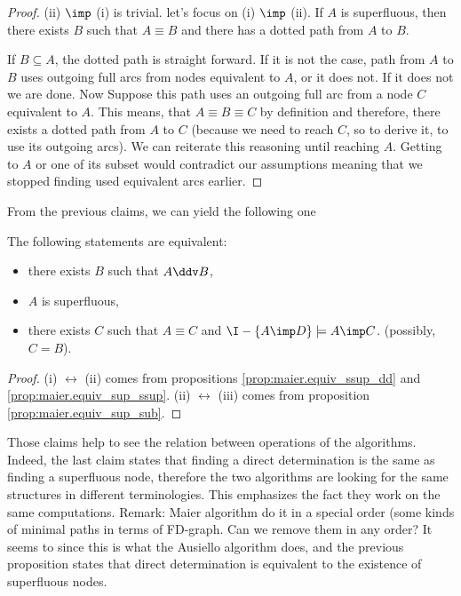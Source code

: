 \begin{proof} (ii) $\imp$ (i) is trivial. let's focus on (i) $\imp$ (ii). If 
	$A$ is superfluous, then there exists $B$ such that $A \equiv B$ and there 
	has a dotted path from $A$ to $B$.
	
	\vspace{1.2em}
	
	If $B \subseteq A$, the dotted path is straight forward. If it is not the 
	case, path from $A$ to $B$ uses outgoing full arcs from nodes equivalent to 
	$A$, or it does not. If it does not we are done. Now Suppose this
	path uses an outgoing full arc from a node $C$ equivalent to $A$. This 
	means, that $A \equiv B \equiv C$ by definition and therefore, there exists 
	a
	dotted path from $A$ to $C$ (because we need to reach $C$, so to derive it,
	to use its outgoing arcs). We can reiterate this reasoning until reaching 
	$A$. Getting to $A$ or one of its subset would contradict our assumptions 
	meaning that we stopped finding used equivalent arcs earlier.
	
\end{proof}

From the previous claims, we can yield the following one

\begin{proposition} \label{prop:maier.equiv_sup_dd_sub}
	The following statements are equivalent:
	\begin{itemize}
		\item[(i)] there exists $B$ such that $A \ddv B$,
		\item[(ii)] $A$ is superfluous,
		\item[(iii)] there exists $C$ such that $A \equiv C$ and $\I - \{A \imp 
		D \} \models A \imp C$. (possibly, $C = B$).
	\end{itemize}
\end{proposition}

\begin{proof} (i) $\longleftrightarrow$ (ii) comes from propositions 
	\ref{prop:maier.equiv_ssup_dd} and \ref{prop:maier.equiv_sup_ssup}. (ii) 
	$\longleftrightarrow$ (iii) comes from proposition 
	\ref{prop:maier.equiv_sup_sub}.
	
\end{proof}

Those claims help to see the relation between operations of the algorithms. 
Indeed, the last claim states that finding a direct determination is the same
as finding a superfluous node, therefore the two algorithms are looking for
the same structures in different terminologies. This emphasizes the fact they
work on the same computations. Remark: Maier algorithm do it in a special 
order (some kinds of minimal paths in terms of FD-graph. Can we remove them in 
any order? It seems to since this is what the Ausiello algorithm does, and
the previous proposition states that direct determination is equivalent to the
existence of superfluous nodes.

